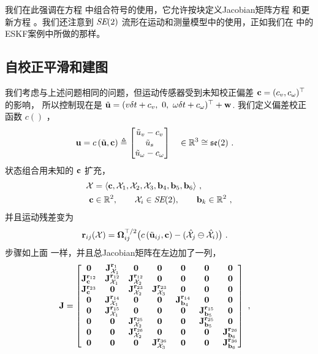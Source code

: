 我们在此强调在方程  中组合符号的使用，它允许按块定义Jacobian矩阵方程  和更新方程  。我们还注意到 $\textit{SE}(2)$ 流形在运动和测量模型中的使用，正如我们在  中的ESKF案例中所做的那样。


\subsection{自校正平滑和建图}

我们考虑与上述问题相同的问题，但运动传感器受到未知校正偏差 ${\bf c}=(c_v,c_\omega)^{\top}$ 的影响，
 所以控制现在是 $
\tilde{{\bf u}} 
=
(v\delta t + c_v ,~
0 ,~
\omega \delta t + c_\omega)^{\top} + {\bf w}
$.
%
我们定义偏差校正函数 $c()$ ，
%
\begin{align}\label{equ:bias}
{\bf u} &= c\,(\tilde{{\bf u}}, {\bf c}) \triangleq \begin{bmatrix}
\tilde u_v - c_v \\
\tilde u_s \\
\tilde u_\omega - c_\omega
\end{bmatrix} \quad \in {\mathbb R}^3\cong{\mathfrak {se}}(2)
~.
\end{align}
%
状态组合用未知的 ${\bf c}$ 扩充，
%
\begin{align*}
\mathcal{X} &= \langle
{\bf c}, \mathcal{X}_1 , \mathcal{X}_2 , \mathcal{X}_3 , {\bf b}_4 , {\bf b}_5 , {\bf b}_6
\rangle
~, 
\\
{\bf c}&\in{\mathbb R}^2,\qquad\mathcal{X}_i\in\textit{SE}(2),\qquad{\bf b}_k\in{\mathbb R}^2
~,
\end{align*}
%
并且运动残差变为
%
\begin{align*}
{\bf r}_{ij}(\mathcal{X}) &= {\bm \Omega}_{ij}^{\top/2}\big(c\,(\tilde{{\bf u}}_{ij} , {\bf c}) - (\hat{\mathcal{X}}_j\ominus\hat{\mathcal{X}}_i)\big)
~.
\end{align*}
%
步骤如上面  一样，并且总Jacobian矩阵在左边加了一列，
%
\begin{align*}
{\bf J} &= \begin{bmatrix}
\bf0 & {{\bf J}^{{\bf r}_{1}}_{\mathcal{X}_1}} & \bf0 & \bf0 & \bf0 & \bf0 & \bf0 \\ 
{{\bf J}^{{\bf r}_{12}}_{{\bf c}}} & {{\bf J}^{{\bf r}_{12}}_{\mathcal{X}_1}} & {{\bf J}^{{\bf r}_{12}}_{\mathcal{X}_2}} & \bf0 & \bf0 & \bf0 & \bf0 \\ 
{{\bf J}^{{\bf r}_{23}}_{{\bf c}}} & \bf0 & {{\bf J}^{{\bf r}_{23}}_{\mathcal{X}_2}} & {{\bf J}^{{\bf r}_{23}}_{\mathcal{X}_3}} & \bf0 & \bf0 & \bf0 \\ 
\bf0 & {{\bf J}^{{\bf r}_{14}}_{\mathcal{X}_1}} & \bf0 & \bf0 & {{\bf J}^{{\bf r}_{14}}_{{\bf b}_4}} & \bf0 & \bf0 \\ 
\bf0 & {{\bf J}^{{\bf r}_{15}}_{\mathcal{X}_1}} & \bf0 & \bf0 & \bf0 & {{\bf J}^{{\bf r}_{15}}_{{\bf b}_5}} & \bf0 \\ 
\bf0 & \bf0 & {{\bf J}^{{\bf r}_{25}}_{\mathcal{X}_2}} & \bf0 & \bf0 & {{\bf J}^{{\bf r}_{25}}_{{\bf b}_5}} & \bf0 \\ 
\bf0 & \bf0 & {{\bf J}^{{\bf r}_{26}}_{\mathcal{X}_2}} & \bf0 & \bf0 & \bf0 & {{\bf J}^{{\bf r}_{26}}_{{\bf b}_6}} \\ 
\bf0 & \bf0 & \bf0 & {{\bf J}^{{\bf r}_{36}}_{\mathcal{X}_3}} & \bf0 & \bf0 & {{\bf J}^{{\bf r}_{36}}_{{\bf b}_6}} 
\end{bmatrix}
~,
\end{align*}
